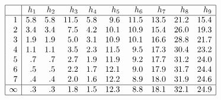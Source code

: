 \documentclass{standalone}
\begin{document}
$%
\begin{array}{|r|rrrrrrrrr|} \hline
& h_1 & h_2 & h_3 & h_4 & h_5 & h_6 & h_7 & h_8 & h_9 \\
\hline
 1 &5.8 &5.8 &11.5 & 5.8 &  9.6 &11.5 & 13.5 & 21.2 & 15.4\\
 2 &3.4 &3.4 & 7.5 & 4.2 & 10.1 &10.9 & 15.4 & 26.0 & 19.3\\
 3 &1.9 &1.9 & 5.0 & 3.1 & 10.9 &10.1 & 16.6 & 28.8 & 21.7\\
 4 &1.1 &1.1 & 3.5 & 2.3 & 11.5 & 9.5 & 17.3 & 30.4 & 23.2\\
 5 & .7 & .7 & 2.7 & 1.9 & 11.9 & 9.2 & 17.7 & 31.2 & 24.0\\
 6 & .5 & .5 & 2.2 & 1.7 & 12.1 & 9.0 & 17.9 & 31.7 & 24.4\\
 7 & .4 & .4 & 2.0 & 1.6 & 12.2 & 8.9 & 18.0 & 31.9 & 24.6\\
\hline
\infty & .3 & .3 & 1.8 & 1.5 & 12.3 & 8.8 & 18.1 & 32.1 & 24.9\\
\hline
\end{array}
$
\end{document}
